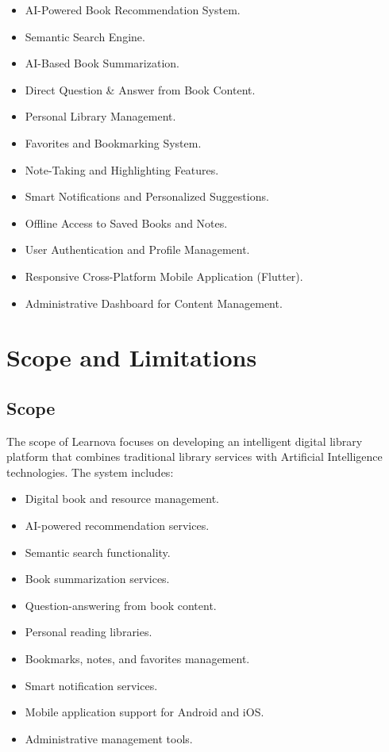 \begin{itemize}
  \item AI-Powered Book Recommendation System.
  \item Semantic Search Engine.
  \item AI-Based Book Summarization.
  \item Direct Question \& Answer from Book Content.
  \item Personal Library Management.
  \item Favorites and Bookmarking System.
  \item Note-Taking and Highlighting Features.
  \item Smart Notifications and Personalized Suggestions.
  \item Offline Access to Saved Books and Notes.
  \item User Authentication and Profile Management.
  \item Responsive Cross-Platform Mobile Application (Flutter).
  \item Administrative Dashboard for Content Management.
\end{itemize}

\section{Scope and Limitations}
\label{sec:scope}

\subsection{Scope}

The scope of Learnova focuses on developing an intelligent digital library
platform that combines traditional library services with Artificial
Intelligence technologies. The system includes:

\begin{itemize}
  \item Digital book and resource management.
  \item AI-powered recommendation services.
  \item Semantic search functionality.
  \item Book summarization services.
  \item Question-answering from book content.
  \item Personal reading libraries.
  \item Bookmarks, notes, and favorites management.
  \item Smart notification services.
  \item Mobile application support for Android and iOS.
  \item Administrative management tools.
\end{itemize}

